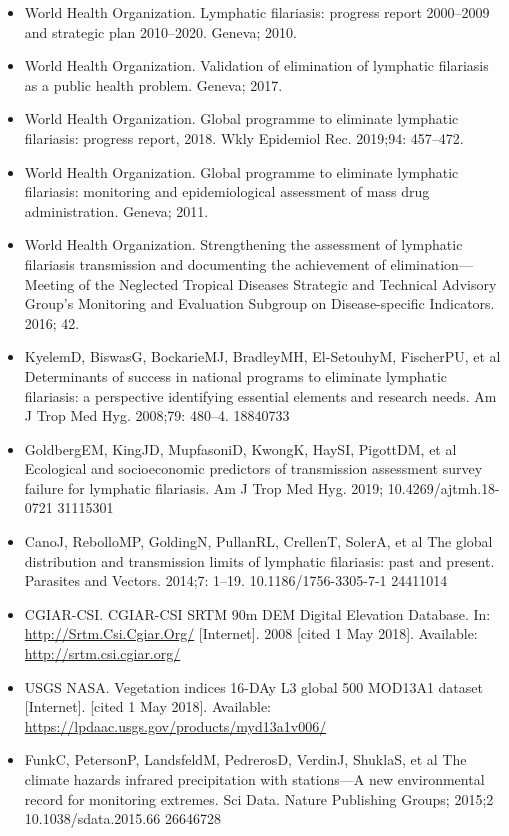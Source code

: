 \documentclass[11pt,a4paper]{article}
\begin{document}
\begin{itemize}
\item World Health Organization. Lymphatic filariasis: progress report 2000–2009 and strategic plan 2010–2020. Geneva; 2010.
\item World Health Organization. Validation of elimination of lymphatic filariasis as a public health problem. Geneva; 2017.
\item World Health Organization. Global programme to eliminate lymphatic filariasis: progress report, 2018. Wkly Epidemiol Rec. 2019;94: 457–472.
\item World Health Organization. Global programme to eliminate lymphatic filariasis: monitoring and epidemiological assessment of mass drug administration. Geneva; 2011.
\item World Health Organization. Strengthening the assessment of lymphatic filariasis transmission and documenting the achievement of elimination—Meeting of the Neglected Tropical Diseases Strategic and Technical Advisory Group’s Monitoring and Evaluation Subgroup on Disease-specific Indicators. 2016; 42.
\item KyelemD, BiswasG, BockarieMJ, BradleyMH, El-SetouhyM, FischerPU, et al Determinants of success in national programs to eliminate lymphatic filariasis: a perspective identifying essential elements and research needs. Am J Trop Med Hyg. 2008;79: 480–4. 18840733
\item GoldbergEM, KingJD, MupfasoniD, KwongK, HaySI, PigottDM, et al Ecological and socioeconomic predictors of transmission assessment survey failure for lymphatic filariasis. Am J Trop Med Hyg. 2019; 10.4269/ajtmh.18-0721 31115301
\item CanoJ, RebolloMP, GoldingN, PullanRL, CrellenT, SolerA, et al The global distribution and transmission limits of lymphatic filariasis: past and present. Parasites and Vectors. 2014;7: 1–19. 10.1186/1756-3305-7-1 24411014
\item CGIAR-CSI. CGIAR-CSI SRTM 90m DEM Digital Elevation Database. In: \href{http://srtm.csi.cgiar.org/}{http://Srtm.Csi.Cgiar.Org/} [Internet]. 2008 [cited 1 May 2018]. Available: \href{http://srtm.csi.cgiar.org/}{http://srtm.csi.cgiar.org/}
\item USGS NASA. Vegetation indices 16-DAy L3 global 500 MOD13A1 dataset [Internet]. [cited 1 May 2018]. Available: \href{https://lpdaac.usgs.gov/products/myd13a1v006/}{https://lpdaac.usgs.gov/products/myd13a1v006/}
\item FunkC, PetersonP, LandsfeldM, PedrerosD, VerdinJ, ShuklaS, et al The climate hazards infrared precipitation with stations—A new environmental record for monitoring extremes. Sci Data. Nature Publishing Groups; 2015;2 10.1038/sdata.2015.66 26646728

\end{itemize}
\end{document}
